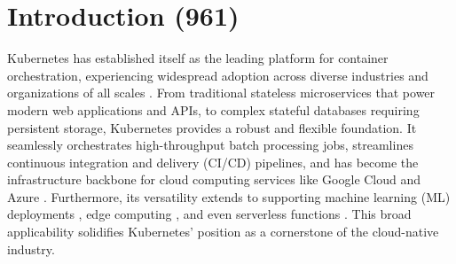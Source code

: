 \chapter{Introduction (961)}
\label{firstcontentpage} %

%
%

%

Kubernetes has established itself as the leading platform for container
orchestration, experiencing widespread adoption across diverse industries and
organizations of all scales \cite{kubernetes-adoption-statistics}. From
traditional stateless microservices that power modern web applications and APIs,
to complex stateful databases requiring persistent storage, Kubernetes provides
a robust and flexible foundation. It seamlessly orchestrates high-throughput
batch processing jobs, streamlines continuous integration and delivery (CI/CD)
pipelines, and has become the infrastructure backbone for cloud computing
services like Google Cloud and Azure \cite{google-gke, azure-aks}. Furthermore,
its versatility extends to supporting machine learning (ML) deployments
\cite{kubernetes-ai}, edge computing \cite{cloudraft}, and even serverless
functions \cite{knative, openwhisk}. This broad applicability solidifies
Kubernetes' position as a cornerstone of the cloud-native industry.

